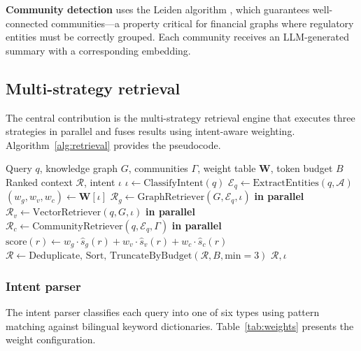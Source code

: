\documentclass[review]{elsarticle}
\begin{document}
\textbf{Community detection} uses the Leiden algorithm \citep{traag2019leiden}, which guarantees well-connected communities---a property critical for financial graphs where regulatory entities must be correctly grouped. Each community receives an LLM-generated summary with a corresponding embedding.


\subsection{Multi-strategy retrieval}
\label{sec:retrieval}

The central contribution is the multi-strategy retrieval engine that executes three strategies in parallel and fuses results using intent-aware weighting. Algorithm~\ref{alg:retrieval} provides the pseudocode.

\begin{algorithm}[t]
\caption{Multi-Strategy Intent-Aware Retrieval}
\label{alg:retrieval}
\begin{algorithmic}[1]
\Require Query $q$, knowledge graph $G$, communities $\Gamma$, weight table $\mathbf{W}$, token budget $B$
\Ensure Ranked context $\mathcal{R}$, intent $\iota$
\State $\iota \gets \text{ClassifyIntent}(q)$ 
\State $\mathcal{E}_q \gets \text{ExtractEntities}(q, \mathcal{A})$ 
\State $(w_g, w_v, w_c) \gets \mathbf{W}[\iota]$ 
\State $\mathcal{R}_g \gets \text{GraphRetriever}(G, \mathcal{E}_q, \iota)$ \textbf{in parallel}
\State $\mathcal{R}_v \gets \text{VectorRetriever}(q, G, \iota)$ \textbf{in parallel}
\State $\mathcal{R}_c \gets \text{CommunityRetriever}(q, \mathcal{E}_q, \Gamma)$ \textbf{in parallel}
    \State $\text{score}(r) \gets w_g \cdot \hat{s}_g(r) + w_v \cdot \hat{s}_v(r) + w_c \cdot \hat{s}_c(r)$
\EndFor
\State $\mathcal{R} \gets \text{Deduplicate, Sort, TruncateByBudget}(\mathcal{R}, B, \text{min}=3)$
\State \Return $\mathcal{R}, \iota$
\end{algorithmic}
\end{algorithm}

\subsubsection{Intent parser}

The intent parser classifies each query into one of six types using pattern matching against bilingual keyword dictionaries. Table~\ref{tab:weights} presents the weight configuration.
\end{document}
